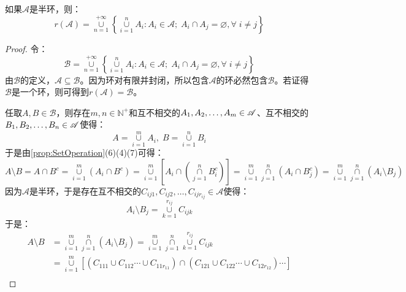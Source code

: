 \begin{theorem}\label{theo:RingGeneratedBySemiring}
	如果$\mathscr{A}$是半环，则：
	\begin{equation*}
		r(\mathscr{A})=
		\underset{n=1}{\overset{+\infty}{\cup}}
		\left\{\underset{i=1}{\overset{n}{\cup}}A_i:A_i\in\mathscr{A};\;A_i\cap A_j=\varnothing,\forall\;i\ne j\right\}
	\end{equation*}
\end{theorem}
\begin{proof}
	令：
	\begin{equation*}
		\mathscr{B}=\underset{n=1}{\overset{+\infty}{\cup}}
		\left\{\underset{i=1}{\overset{n}{\cup}}A_i:A_i\in\mathscr{A};\;A_i\cap A_j=\varnothing,\forall\;i\ne j\right\}
	\end{equation*}
	由$\mathscr{B}$的定义，$\mathscr{A}\subseteq\mathscr{B}$。因为环对有限并封闭，所以包含$\mathscr{A}$的环必然包含$\mathscr{B}$。若证得$\mathscr{B}$是一个环，则可得到$r(\mathscr{A})=\mathscr{B}$。\par
	任取$A,B\in\mathscr{B}$，则存在$m,n\in\mathbb{N}^+$和互不相交的$A_1, A_2, \dots, A_{m}\in\mathscr{A}$、互不相交的$B_1, B_2, \dots, B_{n}\in\mathscr{A}$使得：
	\begin{equation*}
		A=\underset{i=1}{\overset{m}{\cup}}A_i,\;
		B=\underset{i=1}{\overset{n}{\cup}}B_i
	\end{equation*}
	于是由\cref{prop:SetOperation}(6)(4)(7)可得：
	\begin{equation*}
		A\setminus B=A\cap B^c=\underset{i=1}{\overset{m}{\cup}}(A_i\cap B^c)=\underset{i=1}{\overset{m}{\cup}}\left[A_i\cap\left(\underset{j=1}{\overset{n}{\cap}}B_i^c\right)\right]=\underset{i=1}{\overset{m}{\cup}}\underset{j=1}{\overset{n}{\cap}}(A_i\cap B_j^c)=\underset{i=1}{\overset{m}{\cup}}\underset{j=1}{\overset{n}{\cap}}(A_i\setminus B_j)
	\end{equation*}
	因为$\mathscr{A}$是半环，于是存在互不相交的$C_{ij1},C_{ij2},\dots,C_{ijr_{ij}}\in\mathscr{A}$使得：
	\begin{equation*}
		A_i\setminus B_j=\underset{k=1}{\overset{r_{ij}}{\cup}}C_{ijk}
	\end{equation*}
	于是：
	\begin{align*}
		A\setminus B&=\underset{i=1}{\overset{m}{\cup}}\underset{j=1}{\overset{n}{\cap}}(A_i\setminus B_j)=\underset{i=1}{\overset{m}{\cup}}\underset{j=1}{\overset{n}{\cap}}\underset{k=1}{\overset{r_{ij}}{\cup}}C_{ijk} \\
		&=\underset{i=1}{\overset{m}{\cup}}[(C_{111}\cup C_{112}\cdots\cup C_{11r_{11}})\cap(C_{121}\cup C_{122}\cdots\cup C_{12r_{12}})\cdots] \\

\end{align*}
\end{proof}
